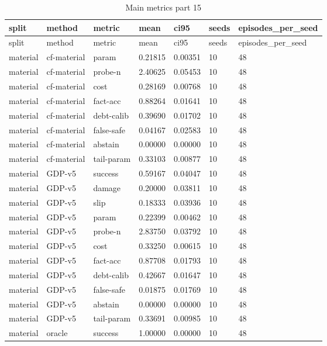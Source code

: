 \documentclass{article}
\begin{document}
\begin{center}
\tiny
\renewcommand{\arraystretch}{0.92}
\setlength{\tabcolsep}{3pt}
\begin{longtable}{lllllll}
\caption{Main metrics part 15}\label{tab:main-metrics-15}\\
\toprule
split & method & metric & mean & ci95 & seeds & episodes\_per\_seed \\
\midrule
\endfirsthead
\toprule
split & method & metric & mean & ci95 & seeds & episodes\_per\_seed \\
\midrule
\endhead
material & cf-material & param & 0.21815 & 0.00351 & 10 & 48 \\
material & cf-material & probe-n & 2.40625 & 0.05453 & 10 & 48 \\
material & cf-material & cost & 0.28169 & 0.00768 & 10 & 48 \\
material & cf-material & fact-acc & 0.88264 & 0.01641 & 10 & 48 \\
material & cf-material & debt-calib & 0.39690 & 0.01702 & 10 & 48 \\
material & cf-material & false-safe & 0.04167 & 0.02583 & 10 & 48 \\
material & cf-material & abstain & 0.00000 & 0.00000 & 10 & 48 \\
material & cf-material & tail-param & 0.33103 & 0.00877 & 10 & 48 \\
material & GDP-v5 & success & 0.59167 & 0.04047 & 10 & 48 \\
material & GDP-v5 & damage & 0.20000 & 0.03811 & 10 & 48 \\
material & GDP-v5 & slip & 0.18333 & 0.03936 & 10 & 48 \\
material & GDP-v5 & param & 0.22399 & 0.00462 & 10 & 48 \\
material & GDP-v5 & probe-n & 2.83750 & 0.03792 & 10 & 48 \\
material & GDP-v5 & cost & 0.33250 & 0.00615 & 10 & 48 \\
material & GDP-v5 & fact-acc & 0.87708 & 0.01793 & 10 & 48 \\
material & GDP-v5 & debt-calib & 0.42667 & 0.01647 & 10 & 48 \\
material & GDP-v5 & false-safe & 0.01875 & 0.01769 & 10 & 48 \\
material & GDP-v5 & abstain & 0.00000 & 0.00000 & 10 & 48 \\
material & GDP-v5 & tail-param & 0.33691 & 0.00985 & 10 & 48 \\
material & oracle & success & 1.00000 & 0.00000 & 10 & 48 \\

\end{longtable}
\end{center}
\end{document}
